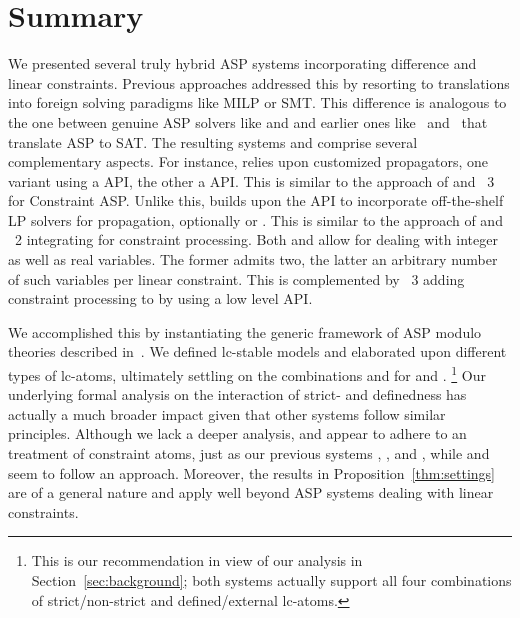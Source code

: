 \section{Summary}\label{sec:summary}

We presented several truly hybrid ASP systems incorporating difference and linear constraints.
Previous approaches addressed this by resorting to translations into foreign solving paradigms like MILP or SMT.
This difference is analogous to the one between genuine ASP solvers like \clasp{} and \wasp{}
and earlier ones like \assat\ and \cmodels\ that translate ASP to SAT.
%
The resulting systems  and  comprise several complementary aspects.
For instance,  relies upon customized propagators, one variant using a \python{} API, the other a \cpp{} API.
This is similar to the approach of \inca{} and \clingcon~3 for Constraint ASP.
Unlike this,  builds upon the \python{} API to incorporate off-the-shelf LP solvers for propagation, optionally \cplex{} or \lpsolve.
This is similar to the approach of \dlvhex[\textsc{cp}] and \clingcon~2 integrating \gecode{} for constraint processing.
Both  and  allow for dealing with integer as well as real variables.
The former admits two, the latter an arbitrary number of such variables per linear constraint.
%
This is complemented by \clingcon~3 adding constraint processing to \clingo{} by using a low level API.

We accomplished this by instantiating the generic framework of ASP modulo theories described in~\cite{gekakaosscwa16a}.
%
We defined lc-stable models and elaborated upon different types of lc-atoms,
ultimately settling on the combinations  and 
for  and .%
\footnote{This is our recommendation in view of our analysis in Section~\ref{sec:background};
  both systems actually support all four combinations of strict/non-strict and defined/external lc-atoms.}
%
Our underlying formal analysis on the interaction of strict- and definedness has actually a much broader impact
given that other systems follow similar principles.
Although we lack a deeper analysis,
\inca{} and \dlvhex[\textsc{cp}] appear to adhere to an  treatment of constraint atoms,
just as our previous systems \clingcon, \dingo, and \mingo, 
while \ezsmt{} and \ezcsp{} seem to follow an  approach.
Moreover, the results in Proposition~\ref{thm:settings} are of a general nature and apply well beyond ASP systems dealing with linear constraints.

